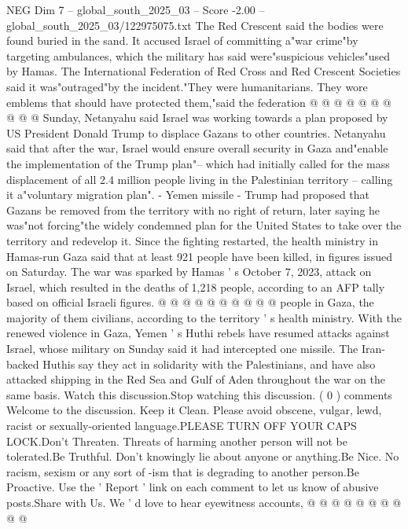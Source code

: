 \begin{textsample}{NEG Dim 7 – global\_south\_2025\_03 – Score -2.00 – global\_south\_2025\_03/122975075.txt}
The Red Crescent said the bodies were found buried in the sand.
It accused Israel of committing a"war crime"by targeting ambulances, which the military has said were"suspicious vehicles"used by Hamas.
The International Federation of Red Cross and Red Crescent Societies said it was"outraged"by the incident."They were humanitarians.
They wore emblems that should have protected them,"said the federation @ @ @ @ @ @ @ @ @ @ Sunday, Netanyahu said Israel was working towards a plan proposed by US President Donald Trump to displace Gazans to other countries.
Netanyahu said that after the war, Israel would ensure overall security in Gaza and"enable the implementation of the Trump plan"-- which had initially called for the mass displacement of all 2.4 million people living in the Palestinian territory -- calling it a"voluntary migration plan". - Yemen missile - Trump had proposed that Gazans be removed from the territory with no right of return, later saying he was"not forcing"the widely condemned plan for the United States to take over the territory and redevelop it.
Since the fighting restarted, the health ministry in Hamas-run Gaza said that at least 921 people have been killed, in figures issued on Saturday.
The war was sparked by Hamas ' s October 7, 2023, attack on Israel, which resulted in the deaths of 1,218 people, according to an AFP tally based on official Israeli figures. @ @ @ @ @ @ @ @ @ @ people in Gaza, the majority of them civilians, according to the territory ' s health ministry.
With the renewed violence in Gaza, Yemen ' s Huthi rebels have resumed attacks against Israel, whose military on Sunday said it had intercepted one missile.
The Iran-backed Huthis say they act in solidarity with the Palestinians, and have also attacked shipping in the Red Sea and Gulf of Aden throughout the war on the same basis.
Watch this discussion.Stop watching this discussion. ( 0 ) comments Welcome to the discussion.
Keep it Clean.
Please avoid obscene, vulgar, lewd, racist or sexually-oriented language.PLEASE TURN OFF YOUR CAPS LOCK.Don't Threaten.
Threats of harming another person will not be tolerated.Be Truthful.
Don't knowingly lie about anyone or anything.Be Nice.
No racism, sexism or any sort of -ism that is degrading to another person.Be Proactive.
Use the ' Report ' link on each comment to let us know of abusive posts.Share with Us.
We ' d love to hear eyewitness accounts, @ @ @ @ @ @ @ @ @ @

\end{textsample}
